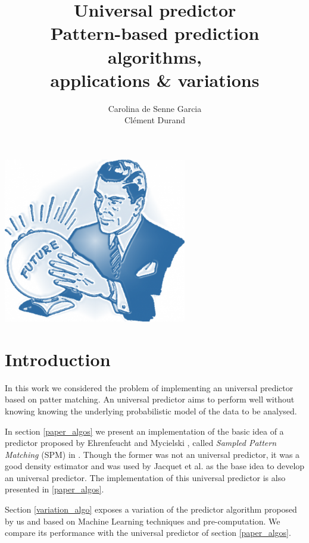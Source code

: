 \documentclass[a4paper,12pt]{article}
\title{%
  \textbf{Universal predictor}\\\small%
  Pattern-based prediction algorithms,\\%
  applications \& variations%
}
\author{%
  Carolina de Senne Garcia\\%
  Clément Durand%
}
\begin{document}
\maketitle

\vspace*{\fill}

\begin{center}
  \includegraphics[width=0.6\textwidth]{images/future}
\end{center}

\vspace*{\fill}

\clearpage

\tableofcontents

\clearpage

\section*{Introduction}

In this work we considered the problem of implementing an universal predictor based on patter matching. An universal predictor aims to perform well without knowing knowing the underlying probabilistic model of the data to be analysed.

In section \ref{paper_algos} we present an implementation of the basic idea of a predictor proposed by Ehrenfeucht and Mycielski \cite{basic_algo}, called \textit{Sampled Pattern Matching} (SPM) in \cite{paper}. Though the former was not an universal predictor, it was a good density estimator and was used by Jacquet et al. \cite{paper} as the base idea to develop an universal predictor. The implementation of this universal predictor is also presented in \ref{paper_algos}.

Section \ref{variation_algo} exposes a variation of the predictor algorithm proposed by us and based on Machine Learning techniques and pre-computation. We compare its performance with the universal predictor of section \ref{paper_algos}.
\end{document}
